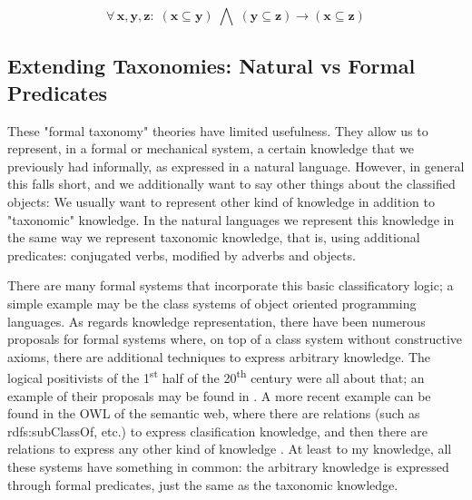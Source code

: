 \documentclass{IOS-Book-Article}     %
\begin{document}
\begin{equation}
\forall\,\mathbf{x\mathrm{,\mathbf{y\mathrm{,\mathbf{z}:\;\left(\mathbf{x\subseteq y}\right)\;\bigwedge\;\left(\mathbf{y\subseteq\mathbf{z}}\right)\rightarrow\left(\mathbf{x\subseteq\mathbf{z}}\right)}}}}
\end{equation}

\subsection{Extending Taxonomies: Natural vs Formal Predicates}
These "formal taxonomy" theories have limited usefulness. They allow us to
represent, in a formal or mechanical system, a certain knowledge that we
previously had informally, as expressed in a natural language. However,
in general this falls short, and we additionally want to say other things about
the classified objects: We usually want to represent other kind of knowledge
in addition to "taxonomic" knowledge. In the natural languages we represent
this knowledge in the same way we represent taxonomic knowledge, that is,
using additional predicates: conjugated verbs, modified by adverbs and objects.

There are many formal systems that incorporate this basic classificatory logic;
a simple example may be the class systems  of object oriented
programming languages. As regards knowledge representation,
there have been numerous proposals for formal systems where,
on top of a class system without constructive axioms, there are
additional techniques to express arbitrary knowledge.
The  logical positivists of the 1\textsuperscript{st} half of the
20\textsuperscript{th} century were all about that;
an example of their proposals may be found in \cite{r3}.
A more recent example can be found in the OWL of the semantic web,
where there are relations (such as rdfs:subClassOf, etc.)
to express clasification knowledge, and then there are relations to express
any other kind of knowledge \cite{r4}. At least to my knowledge, all these
systems have something in common: the arbitrary knowledge is expressed through
formal predicates, just the same as the taxonomic knowledge.
\end{document}
